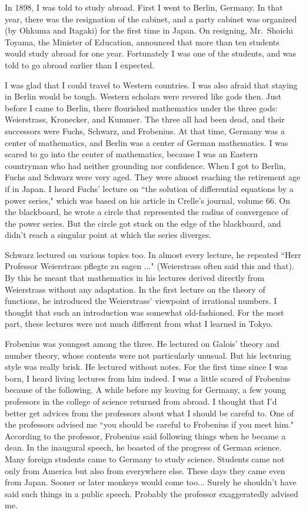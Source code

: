 \documentclass[11pt,a4j,twocolumn]{jarticle}
\begin{document}
In 1898, I was told to study abroad. First I went to Berlin, Germany.
In that year, there was the resignation of the cabinet,
and a party cabinet was organized (by Ohkuma and Itagaki) for the first time in Japan.
On resigning, Mr.\ Shoichi Toyama, the Minister of Education, announced 
that more than ten students would study abroad for one year.
Fortunately I was one of the students, and was told to go abroad earlier than I expected.

I was glad that I could travel to Western countries.
I was also afraid that staying in Berlin would be tough.
Western scholars were revered like gods then.
Just before I came to Berlin, there flourished mathematics under 
the three gods: Weierstrass, Kronecker, and Kummer.
The three all had been dead, and their successors were
Fuchs, Schwarz, and Frobenius.
At that time, Germany was a center of mathematics,
and Berlin was a center of German mathematics.
I was scared to go into the center of mathematics,
because I was an Eastern countryman who had neither grounding nor confidence.
When I got to Berlin, Fuchs and Schwarz were very aged.
They were almost reaching the retirement age if in Japan.
I heard Fuchs' lecture on ``the solution of differential equations by a power series,"
which was based on his article in Crelle's journal, volume 66.
On the blackboard, he wrote a circle that represented the radius of convergence of the power series.
But the circle got stuck on the edge of the blackboard,
and didn't reach a singular point at which the series diverges.

Schwarz lectured on various topics too.
In almost every lecture, he repeated ``Herr Professor Weierstrass pflegte zu sagen ..."
(Weierstrass often said this and that).
By this he meant that mathematics in his lectures
derived directly from Weierstrass without any adaptation.
In the first lecture on the theory of functions,
he introduced the Weierstrass' viewpoint of irrational numbers.
I thought that such an introduction was somewhat old-fashioned.
For the most part, these lectures were not much different
from what I learned in Tokyo.

Frobenius was youngest among the three.
He lectured on Galois' theory and number theory,
whose contents were not particularly unusual.
But his lecturing style was really brisk.
He lectured without notes.
For the first time since I was born, I heard living lectures from him indeed.
I was a little scared of Frobenius because of the following.
A while before my leaving for Germany, 
a few young professors in the college of science returned from abroad.
I thought that I'd better get advices from the professors about what I should be careful to.
One of the professors advised me ``you should be careful to Frobenius if you meet him."
According to the professor, Frobenius said following things when he became a dean.
In the inaugural speech, he boasted of the progress of German science.
Many foreign students came to Germany to study science.
Students came not only from America but also from everywhere else.
These days they came even from Japan.
Sooner or later monkeys would come too...
Surely he shouldn't have said such things in a public speech.
Probably the professor exaggeratedly advised me.
\end{document}
